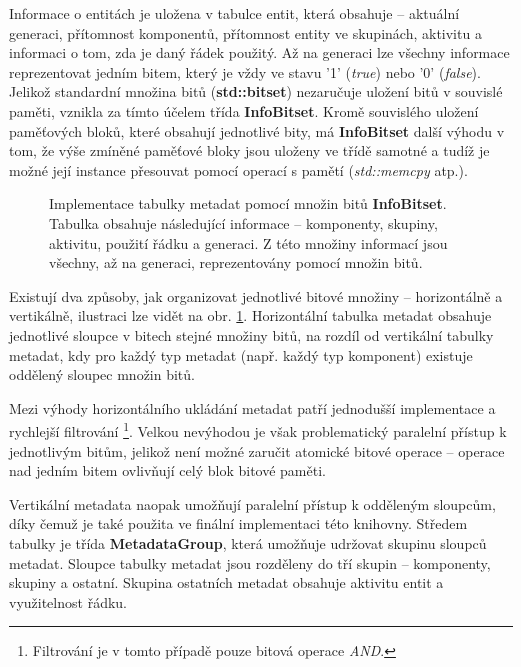 Informace o entitách je uložena v tabulce entit, která obsahuje -- aktuální generaci, přítomnost komponentů, přítomnost entity ve skupinách, aktivitu a informaci o tom, zda je daný řádek použitý. Až na generaci lze všechny informace reprezentovat jedním bitem, který je vždy ve stavu '1' (\emph{true}) nebo '0' (\emph{false}). Jelikož standardní množina bitů (\textbf{std::bitset}) nezaručuje uložení bitů v souvislé paměti, vznikla za tímto účelem třída \textbf{InfoBitset}. Kromě souvislého uložení paměťových bloků, které obsahují jednotlivé bity, má \textbf{InfoBitset} další výhodu v tom, že výše zmíněné paměťové bloky jsou uloženy ve třídě samotné a tudíž je možné její instance přesouvat pomocí operací s pamětí (\emph{std::memcpy} atp.).

\begin{figure}[H]
	\begin{center}
	\end{center}
	\caption{Implementace tabulky metadat pomocí množin bitů \textbf{InfoBitset}. Tabulka obsahuje následující informace -- komponenty, skupiny, aktivitu, použití řádku a generaci. Z této množiny informací jsou všechny, až na generaci, reprezentovány pomocí množin bitů.}
	\label{Fig:IMPLMetadata}
\end{figure}

Existují dva způsoby, jak organizovat jednotlivé bitové množiny -- horizontálně a vertikálně, ilustraci lze vidět na obr. \ref{Fig:IMPLMetadata}. Horizontální tabulka metadat obsahuje jednotlivé sloupce v bitech stejné množiny bitů, na rozdíl od vertikální tabulky metadat, kdy pro každý typ metadat (např. každý typ komponent) existuje oddělený sloupec množin bitů. 

Mezi výhody horizontálního ukládání metadat patří jednodušší implementace a rychlejší filtrování \footnote{Filtrování je v tomto případě pouze bitová operace \emph{AND}.}. Velkou nevýhodou je však problematický paralelní přístup k jednotlivým bitům, jelikož není možné zaručit atomické bitové operace -- operace nad jedním bitem ovlivňují celý blok bitové paměti. 

Vertikální metadata naopak umožňují paralelní přístup k odděleným sloupcům, díky čemuž je také použita ve finální implementaci této knihovny. Středem tabulky je třída \textbf{MetadataGroup}, která umožňuje udržovat skupinu sloupců metadat. Sloupce tabulky metadat jsou rozděleny do tří skupin -- komponenty, skupiny a ostatní. Skupina ostatních metadat obsahuje aktivitu entit a využitelnost řádku.

